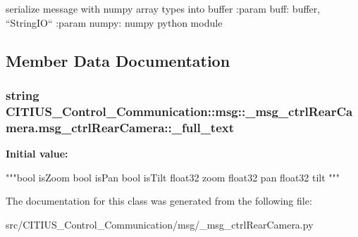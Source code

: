 \begin{DoxyVerb}
serialize message with numpy array types into buffer
:param buff: buffer, ``StringIO``
:param numpy: numpy python module
\end{DoxyVerb}
 

\subsection{\-Member \-Data \-Documentation}
\hypertarget{class_c_i_t_i_u_s___control___communication_1_1msg_1_1__msg__ctrl_rear_camera_1_1msg__ctrl_rear_camera_ac80819cc9baee81f71d4f1dc44b7fe1e}{
\subsubsection[{\-\_\-full\-\_\-text}]{\setlength{\rightskip}{0pt plus 5cm}string \-C\-I\-T\-I\-U\-S\-\_\-\-Control\-\_\-\-Communication\-::msg\-::\-\_\-msg\-\_\-ctrl\-Rear\-Camera.\-msg\-\_\-ctrl\-Rear\-Camera\-::\-\_\-full\-\_\-text}}\label{class_c_i_t_i_u_s___control___communication_1_1msg_1_1__msg__ctrl_rear_camera_1_1msg__ctrl_rear_camera_ac80819cc9baee81f71d4f1dc44b7fe1e}
{\bfseries \-Initial value\-:}
\begin{DoxyCode}
"""bool isZoom
bool isPan
bool isTilt
float32 zoom
float32 pan
float32 tilt
"""
\end{DoxyCode}


\-The documentation for this class was generated from the following file\-:\begin{DoxyCompactItemize}
\item 
src/\-C\-I\-T\-I\-U\-S\-\_\-\-Control\-\_\-\-Communication/msg/\-\_\-msg\-\_\-ctrl\-Rear\-Camera.\-py\end{DoxyCompactItemize}
